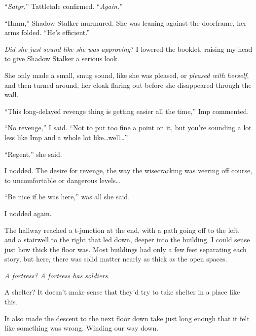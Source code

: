 ``\emph{Satyr},'' Tattletale confirmed.  ``\emph{Again.}''



``Hmm,'' Shadow Stalker murmured.  She was leaning against the doorframe, her arms folded.  ``He's efficient.''



\emph{Did she just sound like she was approving}?  I lowered the booklet, raising my head to give Shadow Stalker a serious look.



She only made a small, smug sound, like she was pleased, or \emph{pleased with herself}, and then turned around, her cloak flaring out before she disappeared through the wall.



``This long-delayed revenge thing is getting easier all the time,'' Imp commented.



``No revenge,'' I said.  ``Not to put too fine a point on it, but you're sounding a lot less like Imp and a whole lot like\ldots well\ldots''



``Regent,'' she said.



I nodded.  The desire for revenge, the way the wisecracking was veering off course, to uncomfortable or dangerous levels\ldots



``Be nice if he was here,'' was all she said.



I nodded again.



The hallway reached a t-junction at the end, with a path going off to the left, and a stairwell to the right that led down, deeper into the building.  I could sense just how thick the floor was.  Most buildings had only a few feet separating each story, but here, there was solid matter nearly as thick as the open spaces.



\emph{A fortress?  A fortress has soldiers.}



A shelter?  It doesn't make sense that they'd try to take shelter in a place like this\emph{.}



It also made the descent to the next floor down take just long enough that it felt like something was wrong.  Winding our way down.



